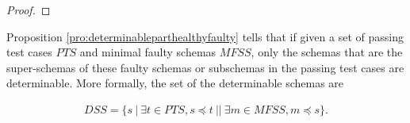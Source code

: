 \begin{proof}

%


\end{proof}

Proposition \ref{pro:determinableparthealthyfaulty} tells that if given a set of passing test cases $PTS$ and minimal faulty schemas $MFSS$, only the schemas that are the super-schemas of these faulty schemas or subschemas in the passing test cases are determinable.  More formally, the set of the determinable schemas are

\begin{equation}
\begin{aligned}\label{eq:dss}
DSS=\{ s\ |\ \exists t \in PTS,  s \preceq t  \ || \  \exists m \in MFSS, m \preceq s \} .
\end{aligned}
\end{equation}
%




